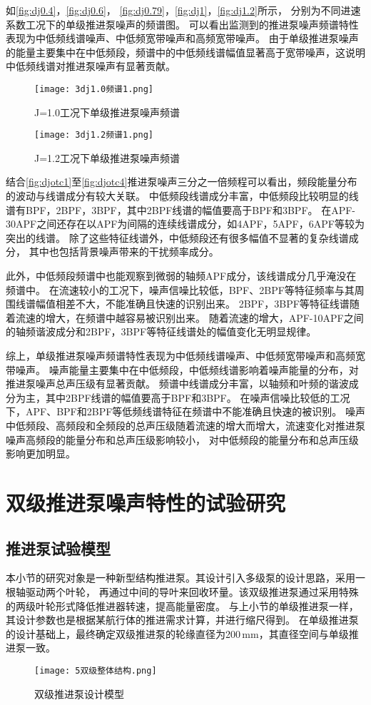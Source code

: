 如\autoref{fig:dj0.4}，\autoref{fig:dj0.6}，
\autoref{fig:dj0.79}，\autoref{fig:dj1}，\autoref{fig:dj1.2}所示，
分别为不同进速系数工况下的单级推进泵噪声的频谱图。
可以看出监测到的推进泵噪声频谱特性表现为中低频线谱噪声、中低频宽带噪声和高频宽带噪声。
由于单级推进泵噪声的能量主要集中在中低频段，频谱中的中低频线谱幅值显著高于宽带噪声，这说明中低频线谱对推进泵噪声有显著贡献。
\begin{figure}[htbp]
    \centering
    \texttt{[image: 3dj1.0频谱1.png]}
    \caption{\label{fig:dj1}J=1.0工况下单级推进泵噪声频谱}
\end{figure}
\begin{figure}[htbp]
    \centering
    \texttt{[image: 3dj1.2频谱1.png]}
    \caption{\label{fig:dj1.2}J=1.2工况下单级推进泵噪声频谱}
\end{figure}

结合\autoref{fig:djotc1}至\autoref{fig:djotc4}推进泵噪声三分之一倍频程可以看出，频段能量分布的波动与线谱成分有较大关联。
中低频段线谱成分丰富，中低频段比较明显的线谱有BPF，2BPF，3BPF，其中2BPF线谱的幅值要高于BPF和3BPF。
在APF-30APF之间还存在以APF为间隔的连续线谱成分，如4APF，5APF，6APF等较为突出的线谱。
除了这些特征线谱外，中低频段还有很多幅值不显著的复杂线谱成分，
其中也包括背景噪声带来的干扰频率成分。

此外，中低频段频谱中也能观察到微弱的轴频APF成分，该线谱成分几乎淹没在频谱中。
在流速较小的工况下，噪声信噪比较低，BPF、2BPF等特征频率与其周围线谱幅值相差不大，不能准确且快速的识别出来。
2BPF，3BPF等特征线谱随着流速的增大，在频谱中越容易被识别出来。
随着流速的增大，APF-10APF之间的轴频谐波成分和2BPF，3BPF等特征线谱处的幅值变化无明显规律。

综上，单级推进泵噪声频谱特性表现为中低频线谱噪声、中低频宽带噪声和高频宽带噪声。
噪声能量主要集中在中低频段，中低频线谱影响着噪声能量的分布，对推进泵噪声总声压级有显著贡献。
频谱中线谱成分丰富，以轴频和叶频的谐波成分为主，其中2BPF线谱的幅值要高于BPF和3BPF。
在噪声信噪比较低的工况下，APF、BPF和2BPF等低频线谱特征在频谱中不能准确且快速的被识别。
噪声中低频段、高频段和全频段的总声压级随着流速的增大而增大，流速变化对推进泵噪声高频段的能量分布和总声压级影响较小，
对中低频段的能量分布和总声压级影响更加明显。

\section{双级推进泵噪声特性的试验研究}
\subsection{推进泵试验模型}
本小节的研究对象是一种新型结构推进泵。其设计引入多级泵的设计思路，采用一根轴驱动两个叶轮，
再通过中间的导叶来回收环量。该双级推进泵通过采用特殊的两级叶轮形式降低推进器转速，提高能量密度。
与上小节的单级推进泵一样，其设计参数也是根据某航行体的推进需求计算，并进行缩尺得到。
在单级推进泵的设计基础上，最终确定双级推进泵的轮缘直径为200\,mm，其直径空间与单级推进泵一致。
\begin{figure}[htbp]
    \centering
    \texttt{[image: 5双级整体结构.png]}
    \caption{\label{fig:sj_modle}双级推进泵设计模型}
\end{figure}

